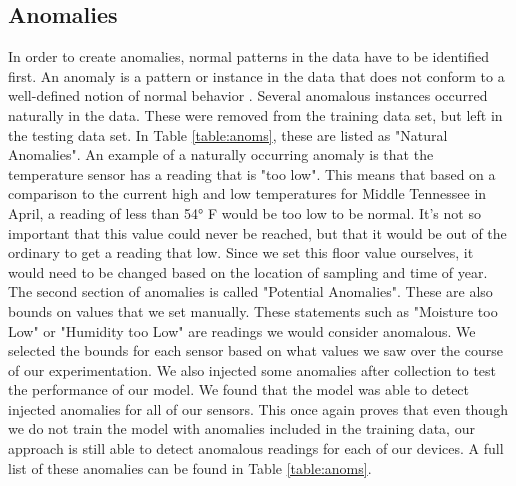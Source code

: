 \subsection{Anomalies}
In order to create anomalies, normal patterns in the data have to be identified first. An anomaly is a pattern or instance in the data that does not conform to a well-defined notion of normal behavior \cite{chandola2009anomaly}. Several anomalous instances occurred naturally in the data. These were removed from the training data set, but left in the testing data set. In Table \ref{table:anoms}, these are listed as "Natural Anomalies". An example of a naturally occurring anomaly is that the temperature sensor has a reading that is "too low". This means that based on a comparison to the current high and low temperatures for Middle Tennessee in April, a reading of less than 54° F would be too low to be normal. It's not so important that this value could never be reached, but that it would be out of the ordinary to get a reading that low. Since we set this floor value ourselves, it would need to be changed based on the location of sampling and time of year. The second section of anomalies is called "Potential Anomalies". These are also bounds on values that we set manually. These statements such as "Moisture too Low" or "Humidity too Low" are readings we would consider anomalous. We selected the bounds for each sensor based on what values we saw over the course of our experimentation. We also injected some anomalies after collection to test the performance of our model. We found that the model was able to detect injected anomalies for all of our sensors. This once again proves that even though we do not train the model with anomalies included in the training data, our approach is still able to detect anomalous readings for each of our devices. A full list of these anomalies can be found in Table \ref{table:anoms}. %

